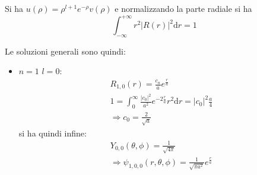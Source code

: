 Si ha $u\left(\rho\right)=\rho^{l+1}e^{-\rho}v\left(\rho\right)$ e normalizzando la parte radiale si ha \[\int_{-\infty }^{+\infty }{r^2|R\left(r\right)|^2 \textrm{d}r}=1\]

Le soluzioni generali sono quindi:
\begin{itemize}
\item $n=1$ $l=0$:
\begin{equation}\begin{split}
R_{1,0}\left(r\right)=\frac{c_n}{a}e^{\frac{r}{a}} \\
1=\int_{0}^{\infty }{\frac{|c_0|^2}{a^2}e^{-2\frac{r}{a}}r^2 \textrm{d}r}=|c_0|^2\frac{a}{4} \\
\Longrightarrow c_0=\frac{2}{\sqrt{a}}
\end{split}\end{equation}
si ha quindi infine:
\begin{equation}\begin{split}
Y_{0,0}\left(\theta,\phi\right)=\frac{1}{\sqrt{4\pi}} \\
\Longrightarrow \psi _{1,0,0}\left(r,\theta,\phi\right)=\frac{1}{\sqrt{\pi a^2}}e^{\frac{r}{a}}
\end{split}\end{equation}


\end{itemize}
